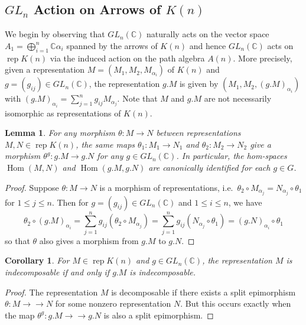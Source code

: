 \documentclass{amsart}
\newtheorem{corollary}[theorem]{Corollary}
\newtheorem{lemma}[theorem]{Lemma}
\numberwithin{equation}{section}
\newcommand{\rep}{\operatorname{rep}}
\newcommand{\CC}{\mathbb{C}}
\newcommand{\Hom}{\operatorname{Hom}}
\newcommand{\onto}{\to\!\!\!\!\!\to}
\begin{document}
\subsection{$GL_n$ Action on Arrows of $K(n)$}
We begin by observing that $GL_n(\CC)$ naturally acts on the vector space $A_1=\bigoplus_{i=1}^n \CC\alpha_i$ spanned by the arrows of $K(n)$ and hence $GL_n(\CC)$ acts on $\rep K(n)$ via the induced action on the path algebra $A(n)$.
More precisely, given a representation $M=(M_1,M_2,M_{\alpha_i})$ of $K(n)$ and $g=(g_{ij})\in GL_n(\CC)$, the representation $g.M$ is given by $(M_1,M_2,(g.M)_{\alpha_i})$ with $(g.M)_{\alpha_i}=\sum\limits_{j=1}^n g_{ij}M_{\alpha_j}$.
Note that $M$ and $g.M$ are not necessarily isomorphic as representations of $K(n)$.
\begin{lemma}
  \label{le:hom equivariance}
  For any morphism $\theta:M\to N$ between representations $M,N\in\rep K(n)$, the same maps $\theta_1:M_1\to N_1$ and $\theta_2:M_2\to N_2$ give a morphism $\theta^g:g.M\to g.N$ for any $g\in GL_n(\CC)$.
  In particular, the hom-spaces $\Hom(M,N)$ and $\Hom(g.M,g.N)$ are canonically identified for each $g\in G$.
\end{lemma}
\begin{proof}
  Suppose $\theta:M\to N$ is a morphism of representations, i.e.\ $\theta_2\circ M_{\alpha_j}=N_{\alpha_j}\circ\theta_1$ for $1\le j\le n$.
  Then for $g=(g_{ij})\in GL_n(\CC)$ and $1\le i\le n$, we have
  \[\theta_2\circ (g.M)_{\alpha_i}=\sum\limits_{j=1}^n g_{ij}(\theta_2\circ M_{\alpha_j})=\sum\limits_{j=1}^n g_{ij}(N_{\alpha_j}\circ\theta_1)=(g.N)_{\alpha_i}\circ\theta_1\]
  so that $\theta$ also gives a morphism from $g.M$ to $g.N$. 
\end{proof}
\begin{corollary}
  \label{cor:indecomposability}
  For $M\in\rep K(n)$ and $g\in GL_n(\CC)$, the representation $M$ is indecomposable if and only if $g.M$ is indecomposable.
\end{corollary}
\begin{proof}
  The representation $M$ is decomposable if there exists a split epimorphism $\theta:M\onto N$ for some nonzero representation $N$.
  But this occurs exactly when the map $\theta^g:g.M\onto g.N$ is also a split epimorphism.
\end{proof}

\end{document}
